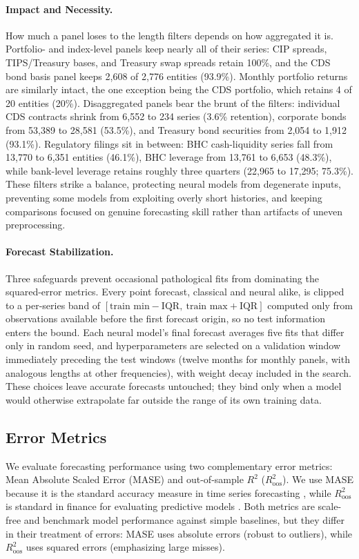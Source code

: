 \documentclass{article}
\begin{document}
\paragraph{Impact and Necessity.} How much a panel loses to the length filters depends on how aggregated it is. Portfolio- and index-level panels keep nearly all of their series: CIP spreads, TIPS/Treasury bases, and Treasury swap spreads retain 100\%, and the CDS bond basis panel keeps 2,608 of 2,776 entities (93.9\%). Monthly portfolio returns are similarly intact, the one exception being the CDS portfolio, which retains 4 of 20 entities (20\%). Disaggregated panels bear the brunt of the filters: individual CDS contracts shrink from 6,552 to 234 series (3.6\% retention), corporate bonds from 53,389 to 28,581 (53.5\%), and Treasury bond securities from 2,054 to 1,912 (93.1\%). Regulatory filings sit in between: BHC cash-liquidity series fall from 13,770 to 6,351 entities (46.1\%), BHC leverage from 13,761 to 6,653 (48.3\%), while bank-level leverage retains roughly three quarters (22,965 to 17,295; 75.3\%). These filters strike a balance, protecting neural models from degenerate inputs, preventing some models from exploiting overly short histories, and keeping comparisons focused on genuine forecasting skill rather than artifacts of uneven preprocessing.

\paragraph{Forecast Stabilization.} Three safeguards prevent occasional pathological fits from dominating the squared-error metrics. Every point forecast, classical and neural alike, is clipped to a per-series band of $[\text{train min} - \mathrm{IQR},\ \text{train max} + \mathrm{IQR}]$ computed only from observations available before the first forecast origin, so no test information enters the bound. Each neural model's final forecast averages five fits that differ only in random seed, and hyperparameters are selected on a validation window immediately preceding the test windows (twelve months for monthly panels, with analogous lengths at other frequencies), with weight decay included in the search. These choices leave accurate forecasts untouched; they bind only when a model would otherwise extrapolate far outside the range of its own training data.

\subsection{Error Metrics}\label{subsec:error_metrics}
We evaluate forecasting performance using two complementary error metrics: Mean Absolute Scaled Error (MASE) and out-of-sample $R^2$ ($R^2_{\text{oos}}$). We use MASE because it is the standard accuracy measure in time series forecasting \citep{Hyndman2006}, while $R^2_{\text{oos}}$ is standard in finance for evaluating predictive models \citep{Campbell2008}. Both metrics are scale-free and benchmark model performance against simple baselines, but they differ in their treatment of errors: MASE uses absolute errors (robust to outliers), while $R^2_{\text{oos}}$ uses squared errors (emphasizing large misses).
\end{document}
